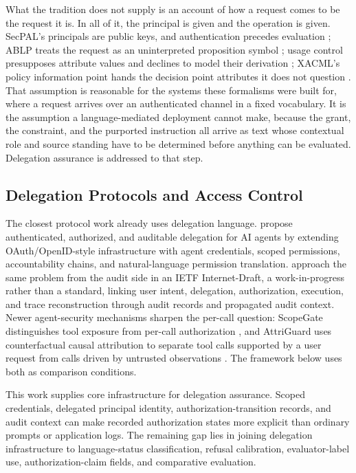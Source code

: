 What the tradition does not supply is an account of how a request comes to be the request it is. In all of it, the principal is given and the operation is given. SecPAL's principals are public keys, and authentication precedes evaluation \citep[sec.~2]{becker2010secpal}; ABLP treats the request as an uninterpreted proposition symbol \citep[sec.~7]{abadi1993calculus}; usage control presupposes attribute values and declines to model their derivation \citep[sec.~9]{park2004ucon}; XACML's policy information point hands the decision point attributes it does not question \citep[sec.~7]{oasis2013xacml}. That assumption is reasonable for the systems these formalisms were built for, where a request arrives over an authenticated channel in a fixed vocabulary. It is the assumption a language-mediated deployment cannot make, because the grant, the constraint, and the purported instruction all arrive as text whose contextual role and source standing have to be determined before anything can be evaluated. Delegation assurance is addressed to that step.

\subsection{Delegation Protocols and Access Control}

The closest protocol work already uses delegation language. \Textcite{south2025authenticated} propose authenticated, authorized, and auditable delegation for AI agents by extending OAuth/OpenID-style infrastructure with agent credentials, scoped permissions, accountability chains, and natural-language permission translation. \Textcite{kuehlewind2026audit} approach the same problem from the audit side in an IETF Internet-Draft, a work-in-progress rather than a standard, linking user intent, delegation, authorization, execution, and trace reconstruction through audit records and propagated audit context. Newer agent-security mechanisms sharpen the per-call question: ScopeGate distinguishes tool exposure from per-call authorization \parencite{mellafezuvic2026scopegate}, and AttriGuard uses counterfactual causal attribution to separate tool calls supported by a user request from calls driven by untrusted observations \parencite{he2026attriguard}. The framework below uses both as comparison conditions.

This work supplies core infrastructure for delegation assurance. Scoped credentials, delegated principal identity, authorization-transition records, and audit context can make recorded authorization states more explicit than ordinary prompts or application logs. The remaining gap lies in joining delegation infrastructure to language-status classification, refusal calibration, evaluator-label use, authorization-claim fields, and comparative evaluation.

